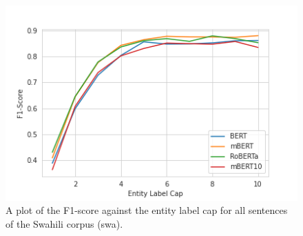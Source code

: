 \documentclass{article}
\begin{document}
\begin{figure}
    \centering
    \includegraphics[width=\columnwidth]{images/swa_models_plot.png}
    \caption{A plot of the F1-score against the entity label cap for all sentences of the Swahili corpus (swa).}
    \label{fig:swa_plot}
\end{figure}
\end{document}
